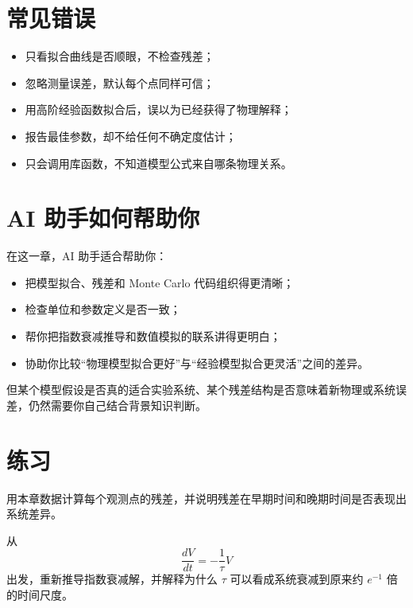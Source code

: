 \section{常见错误}

\begin{warnbox}[实验拟合中的典型问题]
\begin{itemize}
    \item 只看拟合曲线是否顺眼，不检查残差；
    \item 忽略测量误差，默认每个点同样可信；
    \item 用高阶经验函数拟合后，误以为已经获得了物理解释；
    \item 报告最佳参数，却不给任何不确定度估计；
    \item 只会调用库函数，不知道模型公式来自哪条物理关系。
\end{itemize}
\end{warnbox}

\section{AI 助手如何帮助你}

在这一章，AI 助手适合帮助你：

\begin{itemize}
    \item 把模型拟合、残差和 Monte Carlo 代码组织得更清晰；
    \item 检查单位和参数定义是否一致；
    \item 帮你把指数衰减推导和数值模拟的联系讲得更明白；
    \item 协助你比较“物理模型拟合更好”与“经验模型拟合更灵活”之间的差异。
\end{itemize}

但某个模型假设是否真的适合实验系统、某个残差结构是否意味着新物理或系统误差，仍然需要你自己结合背景知识判断。

\section{练习}

\begin{exercisebox}[基础练习]
用本章数据计算每个观测点的残差，并说明残差在早期时间和晚期时间是否表现出系统差异。
\end{exercisebox}

\begin{exercisebox}[进阶练习]
从
\[
\frac{dV}{dt} = -\frac{1}{\tau}V
\]
出发，重新推导指数衰减解，并解释为什么 $\tau$ 可以看成系统衰减到原来约 $e^{-1}$ 倍的时间尺度。
\end{exercisebox}

